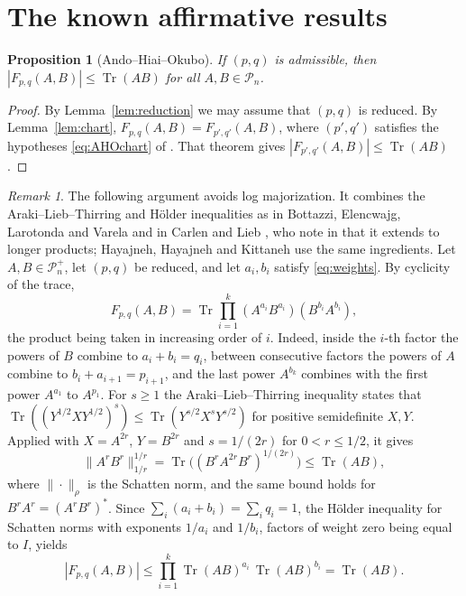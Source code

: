 \documentclass{amsart}
\newtheorem{proposition}[theorem]{Proposition}
\theoremstyle{definition}
\theoremstyle{remark}
\newtheorem{remark}[theorem]{Remark}
\numberwithin{equation}{section}
\newcommand{\Tr}{\operatorname{Tr}}
\newcommand{\PSD}{\mathcal{P}_n}
\newcommand{\PD}{\mathcal{P}_n^{+}}
\begin{document}
\section{The known affirmative results}\label{sec:known}

\begin{proposition}[Ando--Hiai--Okubo]\label{prop:AHO}
If $(p,q)$ is admissible, then $|F_{p,q}(A,B)|\le\Tr(AB)$ for all $A,B\in\PSD$.
\end{proposition}

\begin{proof}
By Lemma~\ref{lem:reduction} we may assume that $(p,q)$ is reduced. By Lemma~\ref{lem:chart}, $F_{p,q}(A,B)=F_{p',q'}(A,B)$, where $(p',q')$ satisfies the hypotheses \eqref{eq:AHOchart} of \cite[Theorem~2.1]{AHO}. That theorem gives $|F_{p',q'}(A,B)|\le\Tr(AB)$ \cite[(2.2)]{AHO}.
\end{proof}

\begin{remark}\label{rem:ALT}
The following argument avoids log majorization. It combines the Araki--Lieb--Thirring and H\"older inequalities as in Bottazzi, Elencwajg, Larotonda and Varela \cite{BELV} and in Carlen and Lieb \cite[Theorem~2.1]{CL}, who note in \cite[Remark~2.3]{CL} that it extends to longer products; Hayajneh, Hayajneh and Kittaneh \cite{HHK} use the same ingredients. Let $A,B\in\PD$, let $(p,q)$ be reduced, and let $a_i,b_i$ satisfy \eqref{eq:weights}. By cyclicity of the trace,
\begin{equation}\label{eq:factorization}
F_{p,q}(A,B)=\Tr\prod_{i=1}^{k}(A^{a_i}B^{a_i})(B^{b_i}A^{b_i}),
\end{equation}
the product being taken in increasing order of $i$. Indeed, inside the $i$-th factor the powers of $B$ combine to $a_i+b_i=q_i$, between consecutive factors the powers of $A$ combine to $b_i+a_{i+1}=p_{i+1}$, and the last power $A^{b_k}$ combines with the first power $A^{a_1}$ to $A^{p_1}$. For $s\ge 1$ the Araki--Lieb--Thirring inequality \cite{Ar,LT} states that $\Tr((Y^{1/2}XY^{1/2})^s)\le\Tr(Y^{s/2}X^sY^{s/2})$ for positive semidefinite $X,Y$. Applied with $X=A^{2r}$, $Y=B^{2r}$ and $s=1/(2r)$ for $0<r\le 1/2$, it gives
\[
\|A^rB^r\|_{1/r}^{1/r}=\Tr\bigl((B^rA^{2r}B^r)^{1/(2r)}\bigr)\le\Tr(AB),
\]
where $\|\cdot\|_\rho$ is the Schatten norm, and the same bound holds for $B^rA^r=(A^rB^r)^*$. Since $\sum_i(a_i+b_i)=\sum_iq_i=1$, the H\"older inequality for Schatten norms \cite[Theorem~2.8]{Si} with exponents $1/a_i$ and $1/b_i$, factors of weight zero being equal to $I$, yields
\[
|F_{p,q}(A,B)|\le\prod_{i=1}^{k}\Tr(AB)^{a_i}\,\Tr(AB)^{b_i}=\Tr(AB).
\]
\end{remark}
\end{document}
